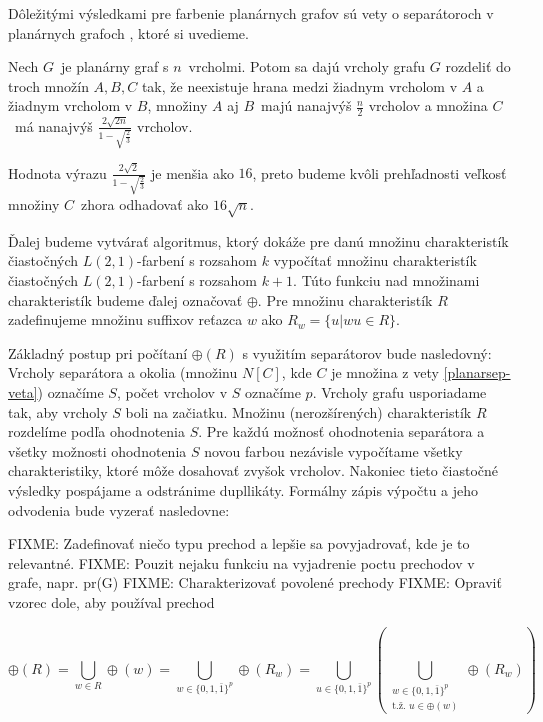 Dôležitými výsledkami pre farbenie planárnych grafov sú vety o separátoroch v planárnych grafoch \cite{tarjan_plansep},
ktoré si uvedieme.

\begin{veta}
    \label{planarsep-veta}
    Nech $G$ je planárny graf s $n$ vrcholmi. Potom sa dajú vrcholy grafu $G$ rozdeliť do troch množín $A, B, C$ tak,
    že neexistuje hrana medzi žiadnym vrcholom v $A$ a žiadnym vrcholom v $B$, množiny $A$ aj $B$ majú nanajvýš $\frac{n}{2}$
    vrcholov a množina $C$ má nanajvýš $\frac{2 \sqrt{2n}}{1 - \sqrt{\frac{2}{3}}}$ vrcholov.
\end{veta}

\begin{pozn}
Hodnota výrazu $\frac{2 \sqrt{2}}{1 - \sqrt{\frac{2}{3}}}$ je menšia ako $16$, preto budeme kvôli prehľadnosti
veľkosť množiny $C$ zhora odhadovať ako $16 \sqrt{n}$.
\end{pozn}

Ďalej budeme vytvárať algoritmus, ktorý dokáže pre danú množinu charakteristík čiastočných $L(2,1)$-farbení
s rozsahom $k$ vypočítať množinu charakteristík čiastočných $L(2,1)$-farbení s rozsahom $k+1$. Túto funkciu
nad množinami charakteristík budeme ďalej označovať $\oplus$. Pre množinu charakteristík $R$ zadefinujeme
množinu suffixov reťazca $w$ ako $R_w = \{u | wu \in R \}$.

Základný postup pri počítaní $\oplus(R)$ s využitím separátorov bude nasledovný:
Vrcholy separátora a okolia (množinu $N[C]$, kde $C$ je množina z vety \ref{planarsep-veta})
označíme $S$, počet vrcholov v $S$ označíme $p$. Vrcholy grafu usporiadame tak, aby vrcholy $S$ boli na začiatku.
Množinu (nerozšírených) charakteristík $R$ rozdelíme podľa ohodnotenia $S$. Pre každú možnosť ohodnotenia separátora
a všetky možnosti ohodnotenia $S$ novou farbou nezávisle vypočítame všetky charakteristiky, ktoré môže dosahovať
zvyšok vrcholov. Nakoniec tieto čiastočné výsledky pospájame a odstránime dupllikáty.
Formálny zápis výpočtu a jeho odvodenia bude vyzerať nasledovne:

FIXME: Zadefinovať niečo typu prechod a lepšie sa povyjadrovať, kde je to relevantné.
FIXME: Pouzit nejaku funkciu na vyjadrenie poctu prechodov v grafe, napr. pr(G)
FIXME: Charakterizovať povolené prechody
FIXME: Opraviť vzorec dole, aby používal prechod

$$ \oplus(R) = \bigcup \limits_{w \in R} \oplus(w) = \bigcup \limits_{w \in \{0, 1, \bar{1}\}^p} \oplus(R_w) = \bigcup \limits_{u \in \{0, 1, \bar{1}\}^p} \left(\bigcup \limits_{\substack{w \in \{0, 1, \bar{1}\}^p\\ \textrm{t.ž. } u \in \oplus(w)}} \oplus(R_w) \right)$$

